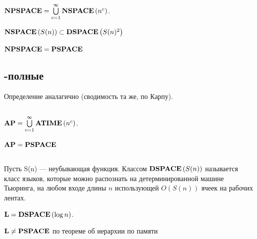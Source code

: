 \begin{definition}
$\textbf{NPSPACE} = \bigcup\limits_{c = 1}^\infty \textbf{NSPACE}\left({n^c}\right)$.
\end{definition}

\begin{theorem}[Сэвич]
$\textbf{NSPACE}\left({S(n)}\right) \subset \textbf{DSPACE}\left({S(n)^2}\right)$
\end{theorem}

\begin{corollary}
$\textbf{NPSPACE} = \textbf{PSPACE}$
\end{corollary}

\subsection{\psp-полные}

\begin{definition}
Определение аналагично \npc (сводимость та же, по Карпу).
\end{definition}

\subsection{\ap}

\begin{definition}
$\textbf{AP} = \bigcup\limits_{c = 1}^\infty \textbf{ATIME}\left({n^c}\right)$.
\end{definition}

\begin{theorem}
$\textbf{AP} = \textbf{PSPACE}$
\end{theorem}

\subsection{\lsp}

\begin{definition}
Пусть S(n) — неубывающая функция. Классом $\textbf{DSPACE}\left({S(n)}\right)$ называется класс языков, которые можно распознать на детерминированной
машине Тьюринга, на любом входе длины $n$ использующей $O(S(n))$ ячеек на рабочих лентах.

$\textbf{L} = \textbf{DSPACE}\left({\log n}\right)$.
\end{definition}

\begin{note}
$\textbf{L} \neq \textbf{PSPACE}$
по теореме об иерархии по памяти
\end{note}

\subsection{\nlsp}

